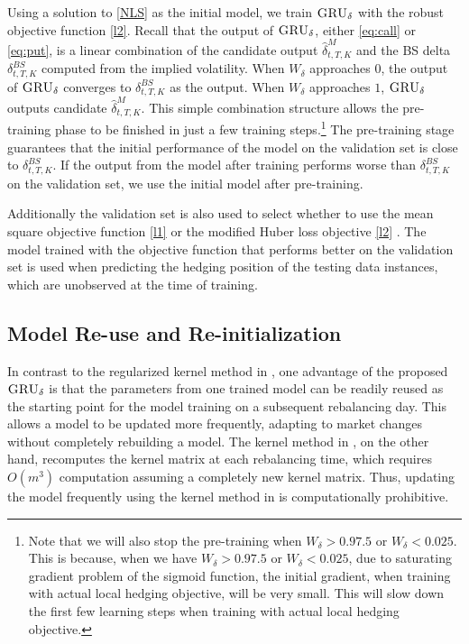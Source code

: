 \documentclass[letterpaper,12pt,titlepage,oneside,final]{book}
\numberwithin{equation}{section}
\theoremstyle{definition}
\newcommand{\model}{\textsc{GRU}_\delta}
\begin{document}
Using a solution to \eqref{NLS} as the initial model, we train $\model$ with the robust objective function \eqref{l2}. Recall that the  output of  $\model$, either \eqref{eq:call} or \eqref{eq:put}, is a linear combination of the candidate output $\widehat{\delta}^M_{t,T,K}$ and the BS delta $\delta^{BS}_{t,T,K}$ computed from the implied volatility. When $W_{\delta}$ approaches 0, the  output of  $\model$ converges to $\delta^{BS}_{t,T,K}$ as the output. When  $W_{\delta}$ approaches $1$,   $\model$ outputs  candidate $\widehat{\delta}^M_{t,T,K}$.
This simple combination structure allows the pre-training phase to be finished in just a few training steps.\footnote{Note that we will also stop the pre-training when $W_{\delta}>0.97.5$ or $W_{\delta}<0.025$. This is because, when we have $W_{\delta}>0.97.5$ or $W_{\delta}<0.025$, due to saturating gradient problem of the sigmoid function, the initial gradient, when training with actual local hedging objective,  will be very small. This will slow down the first few  learning steps when training with actual local hedging objective.}
The pre-training stage guarantees that the initial performance of the model on the validation set is close to $\delta^{BS}_{t,T,K}$. If the output from the model after training performs worse than $\delta^{BS}_{t,T,K}$ on the validation set, we use the initial model after pre-training.


Additionally  the validation set is also used to select  whether to use the mean square objective function \eqref{l1} or  the modified Huber loss objective \eqref{l2} . The model trained with the objective function that performs better on the validation set is used when predicting the hedging position of the testing data instances, which are unobserved at the time of training.


\subsection{Model Re-use and  Re-initialization}
In contrast to the regularized kernel method in \citep{knian2017},  one advantage of the proposed $\model$ is
that the parameters from one trained model can be readily reused as the starting point for the model training on a subsequent rebalancing day.
This allows a model to be updated more frequently, adapting to market changes without completely rebuilding a model.
The kernel method in \citep{knian2017}, on the other hand,  recomputes the kernel matrix at each rebalancing time, which requires $O(m^3)$ computation assuming a completely new kernel matrix. Thus, updating the model frequently using the kernel method in \citep{knian2017} is computationally prohibitive.
\end{document}

